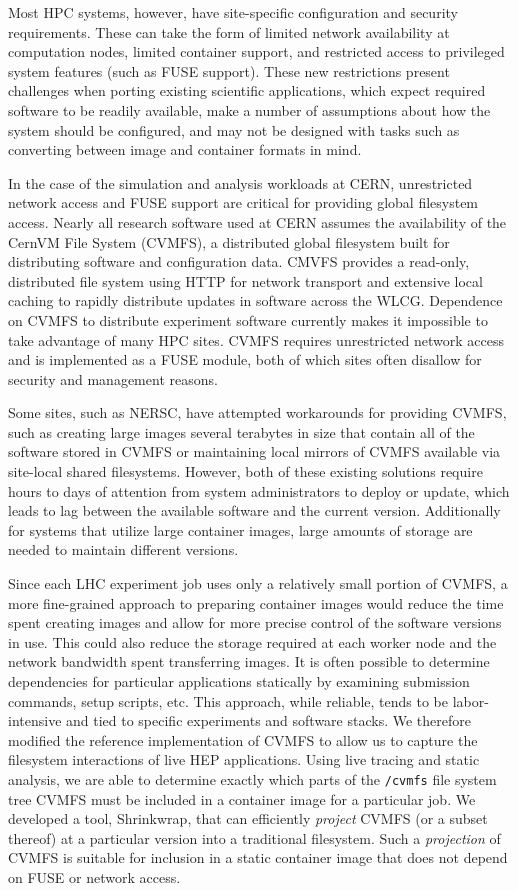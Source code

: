 \documentclass[sigconf]{acmart}
\begin{document}
Most HPC systems, however, have site-specific configuration and security requirements.
These can take the form of limited network availability at computation nodes,
limited container support,
and restricted access to privileged system features (such as FUSE support).
These new restrictions present challenges when porting existing scientific applications,
which expect required software to be readily available,
make a number of assumptions about how the system should be configured,
and may not be designed with tasks such as converting between image and container formats in mind.

In the case of the simulation and analysis workloads at CERN,
unrestricted network access and FUSE support are critical for providing global filesystem access.
Nearly all research software used at CERN assumes the availability of the CernVM File System (CVMFS),
a distributed global filesystem built for distributing software and configuration data.
CMVFS provides a read-only, distributed file system using HTTP for network transport and extensive local
caching to rapidly distribute updates in software across the WLCG.
Dependence on CVMFS to distribute experiment software currently makes it impossible to take advantage of many HPC sites.
CVMFS requires unrestricted network access and is implemented as a FUSE module,
both of which sites often disallow for security and management reasons.

Some sites, such as NERSC,
have attempted workarounds for providing CVMFS,
such as creating large images several terabytes in size that contain all of the software stored in CVMFS or
maintaining local mirrors of CVMFS available via site-local shared filesystems.
However, both of these existing solutions require 
hours to days of attention from system administrators to deploy or update,
which leads to lag between the available software and the current version.
Additionally for systems that utilize large container images, large amounts of storage are needed to maintain different versions.

Since each LHC experiment job uses 
only a relatively small portion of CVMFS,
a more fine-grained approach to preparing container images would reduce the time spent creating images and allow for more precise control of the software versions in use.
This could also reduce the storage required at each worker node and the network bandwidth spent transferring images.
It is often possible to determine dependencies for particular applications statically by examining submission commands, setup scripts, etc.
This approach, while reliable, tends to be labor-intensive and tied to specific experiments and software stacks.
We therefore modified the reference implementation of CVMFS to allow us to capture the filesystem interactions of live HEP applications.
Using live tracing and static analysis,
we are able to determine exactly which parts of the \texttt{/cvmfs} file system tree CVMFS must be included in a container image for a particular job.
We developed a tool, Shrinkwrap, that can efficiently \emph{project} CVMFS (or a subset thereof) at a particular version into a traditional filesystem.
Such a \emph{projection} of CVMFS is suitable for inclusion in a static container image that does not depend on FUSE or network access.
\end{document}
